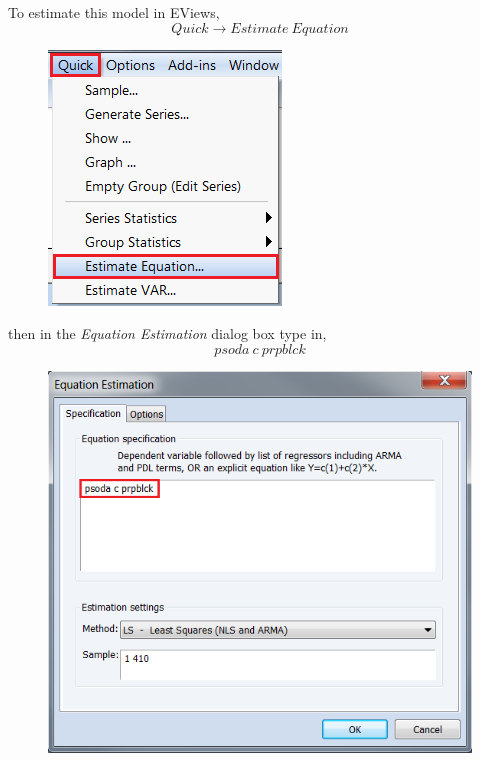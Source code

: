 \documentclass[12pt]{report}
\begin{document}
\noindent To estimate this model in EViews,
$$Quick \to Estimate\ Equation$$
\begin{figure}[H]
	\centering
	\includegraphics{tute5_11}
\end{figure}
\vspace{-\baselineskip}
\noindent then in the \textit{Equation Estimation} dialog box type in,
$$psoda\ c\ prpblck$$
\begin{figure}[H]
	\centering
	\includegraphics{tute5_16}
\end{figure}
\vspace{-\baselineskip}
\end{document}

